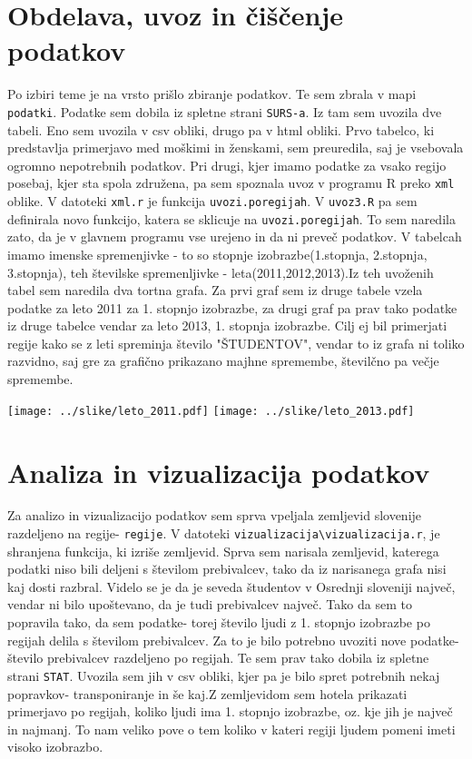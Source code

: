 \documentclass[11pt,a4paper]{article}
\begin{document}
\section{Obdelava, uvoz in čiščenje podatkov}
Po izbiri teme je na vrsto prišlo zbiranje podatkov. Te sem zbrala v mapi \verb|podatki|. Podatke sem dobila iz spletne strani \verb|SURS-a|. Iz tam sem uvozila dve tabeli. Eno sem uvozila v csv obliki, drugo pa v html obliki. Prvo tabelco, ki predstavlja primerjavo med moškimi in ženskami, sem preuredila, saj je vsebovala ogromno nepotrebnih podatkov. Pri drugi, kjer imamo podatke za vsako regijo posebaj, kjer sta spola združena, pa sem spoznala uvoz v programu R preko \verb|xml| oblike. V datoteki \verb|xml.r| je funkcija \verb|uvozi.poregijah|. V \verb|uvoz3.R| pa sem definirala novo funkcijo, katera se sklicuje na \verb|uvozi.poregijah|. To sem naredila zato, da je v glavnem programu vse urejeno in da ni preveč podatkov. V tabelcah imamo imenske spremenjivke - to so stopnje izobrazbe(1.stopnja, 2.stopnja, 3.stopnja), teh številske spremenljivke - leta(2011,2012,2013).Iz teh uvoženih tabel sem naredila dva tortna grafa. Za prvi graf sem iz druge tabele vzela podatke za leto 2011 za 1. stopnjo izobrazbe, za drugi graf pa prav tako podatke iz druge tabelce vendar za leto 2013, 1. stopnja izobrazbe. Cilj ej bil primerjati regije kako se z leti spreminja število "ŠTUDENTOV", vendar to iz grafa ni toliko razvidno, saj gre za grafično prikazano majhne spremembe, številčno pa večje spremembe.

\texttt{[image: ../slike/leto\_2011.pdf]}
\texttt{[image: ../slike/leto\_2013.pdf]}

\pagebreak

\section{Analiza in vizualizacija podatkov}
Za analizo in vizualizacijo podatkov sem sprva vpeljala zemljevid slovenije razdeljeno na regije- \verb|regije|.  V datoteki \verb|vizualizacija\vizualizacija.r|, je shranjena funkcija, ki izriše zemljevid. Sprva sem narisala zemljevid, katerega podatki niso bili deljeni s številom prebivalcev, tako da iz narisanega grafa nisi kaj dosti razbral. Videlo se je da je seveda študentov v Osrednji sloveniji največ, vendar ni bilo upoštevano, da je tudi prebivalcev največ. Tako da sem to popravila tako, da sem podatke- torej število ljudi z 1. stopnjo izobrazbe po regijah delila s številom prebivalcev. Za to je bilo potrebno uvoziti nove podatke-število prebivalcev razdeljeno po regijah. Te sem prav tako dobila iz spletne strani \verb|STAT|. Uvozila sem jih v csv obliki, kjer pa je bilo spret potrebnih nekaj popravkov- transponiranje in še kaj.Z zemljevidom sem hotela prikazati primerjavo po regijah, koliko ljudi ima 1. stopnjo izobrazbe, oz. kje jih je največ in najmanj. To nam veliko pove o tem koliko v kateri regiji ljudem pomeni imeti visoko izobrazbo.
\end{document}
